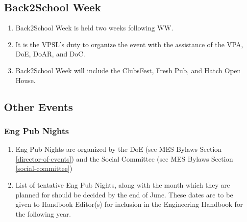 \subsection{Back2School Week}
\label{back2school-week}
\begin{enumerate}
 \item
  Back2School Week is held two weeks following WW.
 \item
  It is the VPSL's duty to organize the event with the assistance of the VPA, DoE, DoAR, and DoC.
 \item
  Back2School Week will include the ClubsFest, Fresh Pub, and Hatch Open House.
\end{enumerate}

\subsection{Other Events}
\label{other-events}

\subsubsection{Eng Pub Nights}
\label{eng-pub-nights}
\begin{enumerate}
 \item
  Eng Pub Nights are organized by the DoE (see MES Bylaws Section \ref{director-of-events}) and the Social Committee (see MES Bylaws Section \ref{social-committee})
 \item
  List of tentative Eng Pub Nights, along with the month which they are planned for should be decided by the end of June. These dates are to be given to Handbook Editor(s) for inclusion in the Engineering Handbook for the following year.
\end{enumerate}
